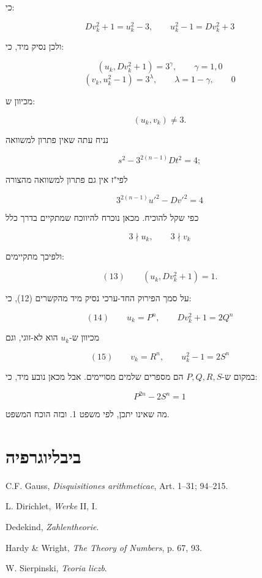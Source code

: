 \noindent כי:

\[ Dv_k^2 + 1 = u_k^2 - 3 , \qquad u_k^2 - 1 = Dv_k^2 + 3 \]

ולכן נסיק מיד, כי:

\[ (u_k , Dv_k^2 + 1) = 3^{\gamma} , \qquad \gamma = 1, 0 \]
\[ (v_k , u_k^2 - 1) = 3^{\lambda} , \qquad \lambda = 1 - \gamma , \qquad 0 \]

מכיוון ש:

\[ (u_k , v_k) \neq 3 . \]

נניח עתה שאין פתרון למשוואה

\[ s^2 - 3^{2(n-1)}Dt^2 = 4 ; \]

לפי"ז אין גם פתרון למשוואה מהצורה

\[ 3^{2(n-1)}u'^2 - Dv'^2 = 4 \]

כפי שקל להוכיח. מכאן נוכרח %
להיווכח שמתקיים בדרך כלל

\[ 3 \nmid u_k , \qquad 3 \nmid v_k \]

ולפיכך מתקיימים:

\[ (13) \qquad (u_k , Dv_k^2 + 1) = 1 . \]

על סמך הפירוק החד-ערכי נסיק מיד מהקשרים (12), כי:

\[ (14) \qquad u_k = P^n , \qquad Dv_k^2 + 1 = 2Q^n \]

מכיוון ש-$u_k$ הוא לא-זוגי, וגם

\[ (15) \qquad v_k = R^n , \qquad u_k^2 - 1 = 2S^n \]

במקום ש-$P, Q, R, S$ הם מספרים שלמים מסויימים. אבל מכאן נובע מיד,
כי:

\[ P^{2n} - 2S^n = 1 \]

מה שאינו יתכן, לפי משפט 1. ובזה הוכח המשפט.

\section*{ביבליוגרפיה}

\foreignlanguage{english}{C.F. Gauss, \textit{Disquisitiones arithmeticae}, Art. 1--31; 94--215.}

\foreignlanguage{english}{L. Dirichlet, \textit{Werke} II, I.}

\foreignlanguage{english}{Dedekind, \textit{Zahlentheorie}.}

\foreignlanguage{english}{Hardy \& Wright, \textit{The Theory of Numbers}, p. 67, 93.}

\foreignlanguage{english}{W. Sierpinski, \textit{Teoria liczb}.}

